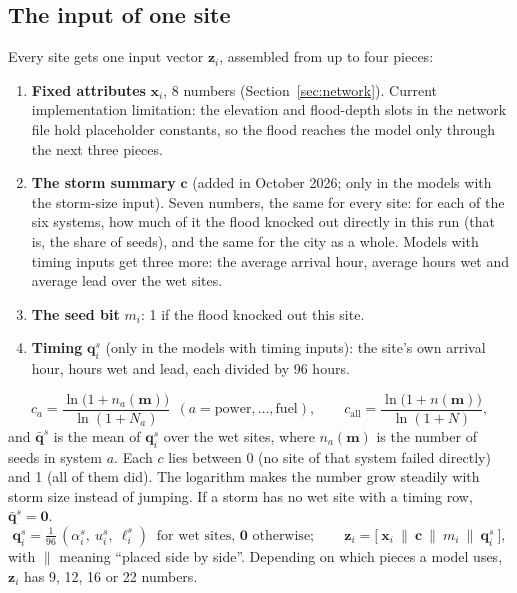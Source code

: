 \documentclass[11pt]{article}
\begin{document}
\subsection{The input of one site}\label{sub:inputs}

Every site gets one input vector $\mathbf z_i$, assembled from up to four pieces:

\begin{enumerate}
\item \textbf{Fixed attributes} $\mathbf x_i$, 8 numbers (Section~\ref{sec:network}). Current implementation limitation: the elevation and flood-depth slots in the network file hold placeholder constants, so the flood reaches the model only through the next three pieces.
\item \textbf{The storm summary} $\mathbf c$ (added in October 2026; only in the models with the storm-size input). Seven numbers, the same for every site: for each of the six systems, how much of it the flood knocked out directly in this run (that is, the share of seeds), and the same for the city as a whole. Models with timing inputs get three more: the average arrival hour, average hours wet and average lead over the wet sites.
\item \textbf{The seed bit} $m_i$: 1 if the flood knocked out this site.
\item \textbf{Timing} $\mathbf q_i^s$ (only in the models with timing inputs): the site's own arrival hour, hours wet and lead, each divided by 96 hours.
\end{enumerate}

\begin{maths}
\[
c_a=\frac{\ln\big(1+n_a(\mathbf m)\big)}{\ln(1+N_a)}\ \ (a=\text{power},\dots,\text{fuel}),\qquad c_{\mathrm{all}}=\frac{\ln\big(1+n(\mathbf m)\big)}{\ln(1+N)},
\]
and $\bar{\mathbf q}^s$ is the mean of $\mathbf q_i^s$ over the wet sites,
where $n_a(\mathbf m)$ is the number of seeds in system $a$. Each $c$ lies between 0 (no site of that system failed directly) and 1 (all of them did). The logarithm makes the number grow steadily with storm size instead of jumping. If a storm has no wet site with a timing row, $\bar{\mathbf q}^s=\mathbf 0$.
\[
\mathbf q_i^s=\tfrac{1}{96}\,(\alpha_i^s,\ u_i^s,\ \ell_i^s)\ \text{ for wet sites, } \mathbf 0 \text{ otherwise};\qquad
\mathbf z_i=\big[\ \mathbf x_i\ \|\ \mathbf c\ \|\ m_i\ \|\ \mathbf q_i^s\ \big],
\]
with $\|$ meaning ``placed side by side''. Depending on which pieces a model uses, $\mathbf z_i$ has 9, 12, 16 or 22 numbers.
\end{maths}
\end{document}
